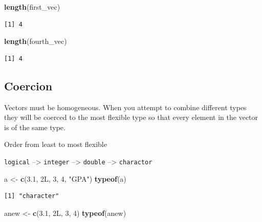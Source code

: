 \documentclass[]{book}
\newenvironment{Shaded}{\begin{snugshade}}{\end{snugshade}}
\newcommand{\DecValTok}[1]{\textcolor[rgb]{0.00,0.00,0.81}{#1}}
\newcommand{\FloatTok}[1]{\textcolor[rgb]{0.00,0.00,0.81}{#1}}
\newcommand{\KeywordTok}[1]{\textcolor[rgb]{0.13,0.29,0.53}{\textbf{#1}}}
\newcommand{\NormalTok}[1]{#1}
\newcommand{\StringTok}[1]{\textcolor[rgb]{0.31,0.60,0.02}{#1}}
\begin{document}
\begin{Shaded}
\begin{Highlighting}[]
\KeywordTok{length}\NormalTok{(first_vec)}
\end{Highlighting}
\end{Shaded}

\begin{verbatim}
[1] 4
\end{verbatim}

\begin{Shaded}
\begin{Highlighting}[]
\KeywordTok{length}\NormalTok{(fourth_vec)}
\end{Highlighting}
\end{Shaded}

\begin{verbatim}
[1] 4
\end{verbatim}

\hypertarget{coercion}{%
\subsection{Coercion}\label{coercion}}

Vectors must be homogeneous. When you attempt to combine different types they will be coerced to the most flexible type so that every element in the vector is of the same type.

Order from least to most flexible

\texttt{logical} --\textgreater{} \texttt{integer} --\textgreater{} \texttt{double} --\textgreater{} \texttt{charactor}

\begin{Shaded}
\begin{Highlighting}[]
\NormalTok{a <-}\StringTok{ }\KeywordTok{c}\NormalTok{(}\FloatTok{3.1}\NormalTok{, 2L, }\DecValTok{3}\NormalTok{, }\DecValTok{4}\NormalTok{, }\StringTok{"GPA"}\NormalTok{) }
\KeywordTok{typeof}\NormalTok{(a) }
\end{Highlighting}
\end{Shaded}

\begin{verbatim}
[1] "character"
\end{verbatim}

\begin{Shaded}
\begin{Highlighting}[]
\NormalTok{anew <-}\StringTok{ }\KeywordTok{c}\NormalTok{(}\FloatTok{3.1}\NormalTok{, 2L, }\DecValTok{3}\NormalTok{, }\DecValTok{4}\NormalTok{)}
\KeywordTok{typeof}\NormalTok{(anew) }
\end{Highlighting}
\end{Shaded}
\end{document}
